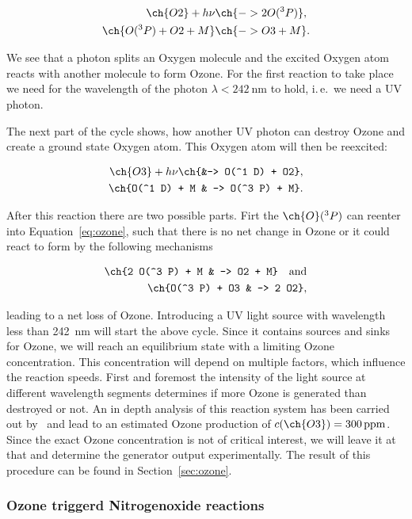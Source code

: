 \begin{align}
  \ch{O2} + h\nu &\ch{-> 2 O(^3P)},\nonumber\\
  \ch{O(^3 P) + O2 + M} &\ch{-> O3 + M}. \label{eq:ozone}
\end{align}

We see that a photon splits an Oxygen molecule and the excited
Oxygen atom reacts with another  molecule to form Ozone. For
the first reaction to take place we need for the wavelength of the
photon $\lambda < \SI{242}{\nano\meter}$ to hold, i.\,e.\ we need a UV
photon. 

The next part of the cycle shows, how another UV photon can destroy
Ozone and create a ground state Oxygen atom. This Oxygen atom will
then be reexcited:

\begin{align}
  \ch{O3} + h\nu \ch{&-> O(^1 D) +
  O2}, \label{eq:split}\\
  \ch{O(^1 D) + M & -> O(^3 P) + M}.\nonumber
\end{align}

After this reaction there are two possible parts. Firt the $\ch{O}(^3
P)$ can reenter into Equation~\eqref{eq:ozone}, such that there is no
net change in Ozone or it could react to form  by the
following mechanisms

\begin{align*}
  \ch{2 O(^3 P) + M & -> O2 + M} \quad \text{and}\\
  \ch{O(^3 P) + O3 & -> 2 O2},
\end{align*}

leading to a net loss of Ozone. Introducing a UV light source with
wavelength less than \SI{242}{\nano\meter} will start the above
cycle. Since it contains sources and sinks for Ozone, we will reach an
equilibrium state with a limiting Ozone concentration. This
concentration will depend on multiple factors, which influence the
reaction speeds. First and foremost the intensity of the light source
at different wavelength segments determines if more Ozone is generated
than destroyed or not. An in depth analysis of this reaction system
has been carried out by~\cite{bsc} and lead to an estimated Ozone
production of $c(\ch{O3}) = \SI{300}{ppm}$. Since the exact Ozone
concentration is not of critical interest, we will leave it at that
and determine the generator output experimentally. The result of this
procedure can be found in Section~\ref{sec:ozone}. 

\subsubsection{Ozone triggerd Nitrogenoxide reactions}
\label{sec:o-no}

